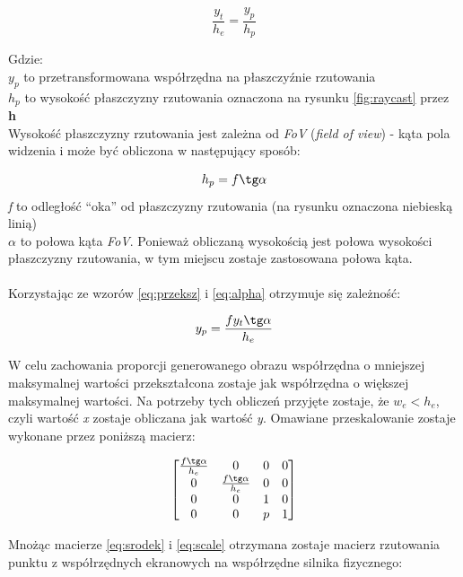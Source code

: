 \begin{equation}
\frac{y_{t}}{h_{e}}=\frac{y_{p}}{h_{p}}
\label{eq:przeksz}
\end{equation}

Gdzie:\\
$ y_{p} $ to przetransformowana współrzędna na płaszczyźnie rzutowania\\
$ h_{p} $ to wysokość płaszczyzny rzutowania oznaczona na rysunku
\ref{fig:raycast} przez \textbf{h}\\
Wysokość płaszczyzny rzutowania jest zależna od \emph{FoV} (\emph{field of
view}) - kąta pola widzenia i może być obliczona w następujący sposób:

\begin{equation}
h_{p} = f \tg \alpha
\label{eq:alpha}
\end{equation}
\emph{f} to odległość ``oka'' od płaszczyzny rzutowania (na rysunku oznaczona
niebieską linią)\\
$ \alpha $ to połowa kąta \emph{FoV}. Ponieważ obliczaną wysokością jest połowa
wysokości płaszczyzny rzutowania, w tym miejscu zostaje zastosowana połowa
kąta.\\
\\
Korzystając ze wzorów \ref{eq:przeksz} i \ref{eq:alpha} otrzymuje się zależność:

\begin{equation}
y_{p} = \frac{fy_{t} \tg \alpha}{h_{e}}
\end{equation}

W celu zachowania proporcji generowanego obrazu współrzędna o mniejszej
maksymalnej wartości przekształcona zostaje jak współrzędna o większej
maksymalnej wartości. Na potrzeby tych obliczeń przyjęte zostaje, że $ w_{e} <
h_{e} $, czyli wartość \emph{x} zostaje obliczana jak wartość \emph{y}.
Omawiane przeskalowanie zostaje wykonane przez poniższą macierz:

\begin{equation}
\begin{bmatrix}\frac{f \tg \alpha}{h_{e}}&0&0&0\\0&\frac{f \tg \alpha}{h_{e}}&0&0\\0&0&1&0\\0&0&p&1\end{bmatrix}
\label{eq:scale}
\end{equation}

Mnożąc macierze \ref{eq:srodek} i \ref{eq:scale} otrzymana zostaje macierz
rzutowania punktu z współrzędnych ekranowych na współrzędne silnika fizycznego:

